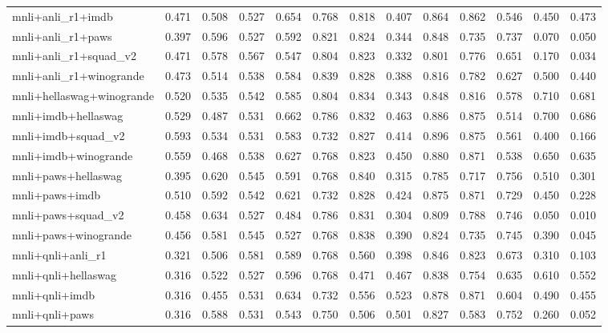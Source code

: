 \begin{table}[t]
\begin{tabular}{lrrrrrrrrrrrr}
    mnli+anli\_r1+imdb & 0.471 & 0.508 & 0.527 & 0.654 & 0.768 & 0.818 & 0.407 & 0.864 & 0.862 & 0.546 & 0.450 & 0.473 \\
    mnli+anli\_r1+paws & 0.397 & 0.596 & 0.527 & 0.592 & 0.821 & 0.824 & 0.344 & 0.848 & 0.735 & 0.737 & 0.070 & 0.050 \\
    mnli+anli\_r1+squad\_v2 & 0.471 & 0.578 & 0.567 & 0.547 & 0.804 & 0.823 & 0.332 & 0.801 & 0.776 & 0.651 & 0.170 & 0.034 \\
    mnli+anli\_r1+winogrande & 0.473 & 0.514 & 0.538 & 0.584 & 0.839 & 0.828 & 0.388 & 0.816 & 0.782 & 0.627 & 0.500 & 0.440 \\
    mnli+hellaswag+winogrande & 0.520 & 0.535 & 0.542 & 0.585 & 0.804 & 0.834 & 0.343 & 0.848 & 0.816 & 0.578 & 0.710 & 0.681 \\
    mnli+imdb+hellaswag & 0.529 & 0.487 & 0.531 & 0.662 & 0.786 & 0.832 & 0.463 & 0.886 & 0.875 & 0.514 & 0.700 & 0.686 \\
    mnli+imdb+squad\_v2 & 0.593 & 0.534 & 0.531 & 0.583 & 0.732 & 0.827 & 0.414 & 0.896 & 0.875 & 0.561 & 0.400 & 0.166 \\
    mnli+imdb+winogrande & 0.559 & 0.468 & 0.538 & 0.627 & 0.768 & 0.823 & 0.450 & 0.880 & 0.871 & 0.538 & 0.650 & 0.635 \\
    mnli+paws+hellaswag & 0.395 & 0.620 & 0.545 & 0.591 & 0.768 & 0.840 & 0.315 & 0.785 & 0.717 & 0.756 & 0.510 & 0.301 \\
    mnli+paws+imdb & 0.510 & 0.592 & 0.542 & 0.621 & 0.732 & 0.828 & 0.424 & 0.875 & 0.871 & 0.729 & 0.450 & 0.228 \\
    mnli+paws+squad\_v2 & 0.458 & 0.634 & 0.527 & 0.484 & 0.786 & 0.831 & 0.304 & 0.809 & 0.788 & 0.746 & 0.050 & 0.010 \\
    mnli+paws+winogrande & 0.456 & 0.581 & 0.545 & 0.527 & 0.768 & 0.838 & 0.390 & 0.824 & 0.735 & 0.745 & 0.390 & 0.045 \\
    mnli+qnli+anli\_r1 & 0.321 & 0.506 & 0.581 & 0.589 & 0.768 & 0.560 & 0.398 & 0.846 & 0.823 & 0.673 & 0.310 & 0.103 \\
    mnli+qnli+hellaswag & 0.316 & 0.522 & 0.527 & 0.596 & 0.768 & 0.471 & 0.467 & 0.838 & 0.754 & 0.635 & 0.610 & 0.552 \\
    mnli+qnli+imdb & 0.316 & 0.455 & 0.531 & 0.634 & 0.732 & 0.556 & 0.523 & 0.878 & 0.871 & 0.604 & 0.490 & 0.455 \\
    mnli+qnli+paws & 0.316 & 0.588 & 0.531 & 0.543 & 0.750 & 0.506 & 0.501 & 0.827 & 0.583 & 0.752 & 0.260 & 0.052 \\

\end{tabular}
\end{table}
